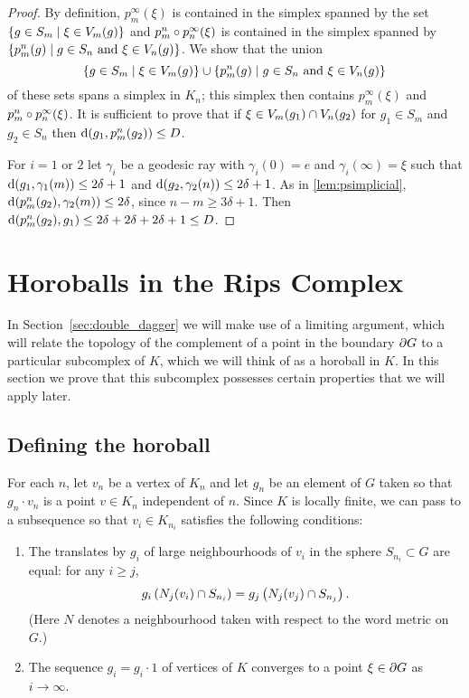 \documentclass[a4paper]{article}
\begin{document}
\begin{proof}
  By definition, $p^\infty_m(\xi)$ is contained in the simplex spanned by the set
  $\left\{g \in S_m \mid \xi \in V_m(g)\right\}$ and $p^n_m\circ p^\infty_n(\xi)$ is
  contained in the simplex spanned by $\{p^n_m(g) \mid g \in S_n \text{
  and } \xi \in V_n(g)\}$.  We show that the union
  \begin{equation*}
    \left\{g \in S_m \mid \xi \in V_m(g)\right\} \cup \{p^n_m(g) \mid g \in S_n \text{ and } \xi \in V_n(g)\}
  \end{equation*}
  of these sets spans a simplex in $K_n$; this simplex then contains
  $p^\infty_m(\xi)$ and $p^n_m\circ p^\infty_n(\xi)$.  It is sufficient to
  prove that if $\xi \in V_m(g_1) \cap V_n(g_2)$ for $g_1 \in S_m$ and
  $g_2 \in S_n$ then $\operatorname{d}(g_1, p^n_m(g_2)) \leq D$.

  For $i = 1$ or $2$ let $\gamma_i$ be a geodesic ray with $\gamma_i(0) = e$ and
  $\gamma_i(\infty) = \xi$ such that $\operatorname{d}(g_1, \gamma_1(m)) \leq 2\delta
  + 1$ and $\operatorname{d}(g_2, \gamma_2(n)) \leq 2\delta+1$.  As in
  \cref{lem:psimplicial}, $\operatorname{d}(p^n_m(g_2), \gamma_2(m)) \leq
  2\delta$, since $n-m \geq 3\delta+1$.  Then $\operatorname{d}(p^n_m(g_2), g_1) \leq
  2\delta + 2\delta + 2\delta+1 \leq D$.
\end{proof}

\section{Horoballs in the Rips Complex}\label{sec:horoballs}

In Section~\ref{sec:double_dagger} we will make use of a limiting argument,
which will relate the topology of the complement of a point in the boundary
$\partial G$ to a particular subcomplex of $K$, which we will think of as
a horoball in $K$.  In this section we prove that this subcomplex possesses
certain properties that we will apply later.

\subsection{Defining the horoball}

For each $n$, let $v_n$ be a vertex of $K_n$ and let $g_n$ be an element of $G$
taken so that $g_n\cdot v_n$ is a point $v \in K_n$ independent of $n$.  Since
$K$ is locally finite, we can pass to a subsequence so that $v_i \in
K_{n_i}$ satisfies the following conditions:
\begin{enumerate}
  \item
    The translates by $g_i$ of large neighbourhoods of $v_i$ in the sphere
    $S_{n_i} \subset G$ are equal: for any $i \geq j$,
    \begin{equation*}
      g_i\left(N_j(v_i) \cap S_{n_i}\right) 
            = g_j\left(N_j(v_j) \cap S_{n_j}\right).
    \end{equation*}
    (Here $N$ denotes a neighbourhood taken with respect to the word metric on
    $G$.)
  \item
    The sequence $g_i = g_i\cdot 1$ of vertices of $K$ converges to a point
    $\xi \in \partial G$ as $i\to\infty$.
\end{enumerate}
\end{document}
